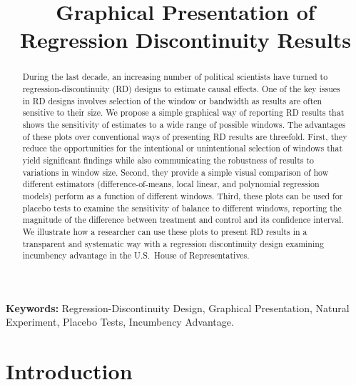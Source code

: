 \documentclass[letterpaper,twoside,12pt]{article}
\providecommand{\keywords}[1]{\textbf{Keywords:} #1}
\begin{document}
\title{Graphical Presentation of Regression Discontinuity Results}
\date{}

\maketitle

\vspace{50mm}

\clearpage
\begin{abstract}
\noindent During the last decade, an increasing number of political scientists have turned to regression-discontinuity (RD) designs to estimate causal effects. One of the key issues in RD designs involves selection of the window or bandwidth as results are often sensitive to their size. We propose a simple graphical way of reporting RD results that shows the sensitivity of estimates to a wide range of possible windows. The advantages of these plots over conventional ways of presenting RD results are threefold. First, they reduce the opportunities for the intentional or unintentional selection of windows that yield significant findings while also communicating the robustness of results to variations in window size. Second, they provide a simple visual comparison of how different estimators (difference-of-means, local linear, and polynomial regression models) perform as a function of different windows. Third, these plots can be used for placebo tests to examine the sensitivity of balance to different windows, reporting the magnitude of the difference between treatment and control and its confidence interval. We illustrate how a researcher can use these plots to present RD results in a transparent and systematic way with a regression discontinuity design examining incumbency advantage in the U.S.\ House of Representatives.
\end{abstract}

\vspace*{10pt}
\noindent \keywords{Regression-Discontinuity Design, Graphical Presentation, Natural Experiment, Placebo Tests, Incumbency Advantage.}

\clearpage

\section{Introduction}
\end{document}
